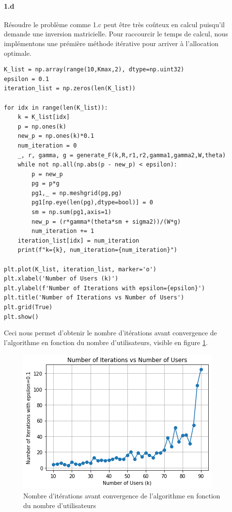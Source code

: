 \documentclass[a4paper,11pt,2]{article}
\begin{document}
\paragraph{1.d} Résoudre le problème comme 1.c peut être très coûteux en calcul puisqu'il demande une inversion matricielle. Pour raccourcir le temps de calcul, nous implémentons une prémière méthode itérative pour arriver à l'allocation optimale.
\begin{center}
\begin{lstlisting}
K_list = np.array(range(10,Kmax,2), dtype=np.uint32)
epsilon = 0.1
iteration_list = np.zeros(len(K_list))

for idx in range(len(K_list)):
    k = K_list[idx]
    p = np.ones(k)
    new_p = np.ones(k)*0.1
    num_iteration = 0
    _, r, gamma, g = generate_F(k,R,r1,r2,gamma1,gamma2,W,theta)
    while not np.all(np.abs(p - new_p) < epsilon):
        p = new_p
        pg = p*g
        pg1,_ = np.meshgrid(pg,pg)
        pg1[np.eye(len(pg),dtype=bool)] = 0
        sm = np.sum(pg1,axis=1)
        new_p = (r*gamma*(theta*sm + sigma2))/(W*g)
        num_iteration += 1
    iteration_list[idx] = num_iteration
    print(f"k={k}, num_iteration={num_iteration}")

plt.plot(K_list, iteration_list, marker='o')
plt.xlabel('Number of Users (k)')
plt.ylabel(f'Number of Iterations with epsilon={epsilon}')
plt.title('Number of Iterations vs Number of Users')
plt.grid(True)
plt.show()
\end{lstlisting}
\end{center}

Ceci nous permet d'obtenir le nombre d'itérations avant convergence de l'algorithme en fonction du nombre d'utilisateurs, visible en figure \ref{fig:II1d}.
\begin{figure}[h]
\centering
\includegraphics[width=0.7\linewidth]{./Images/II-1d.png}
\caption{Nombre d'itérations avant convergence de l'algorithme en fonction du nombre d'utilisateurs}
\label{fig:II1d}
\end{figure}
\end{document}
